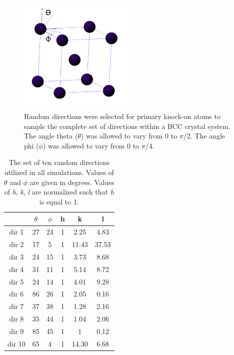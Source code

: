 \documentclass[review]{elsarticle}
\begin{document}
\begin{figure}[hp]
   \centering
   \includegraphics[width=0.5\textwidth]{figure1.png} %
   \caption{Random directions were selected for primary knock-on atoms to sample the complete set of directions within a BCC crystal system.  The angle theta ($\theta$) was allowed to vary from 0 to $\pi$/2.  The angle phi ($\phi$) was allowed to vary from 0 to $\pi$/4.}
   \label{fig:example}
\end{figure}

\begin{table}[htbp]
\caption[c]{The set of ten random directions utilized in all simulations.  Values of $\theta$ and $\phi$ are given in degrees.  Values of \textit{h}, \textit{k}, \textit{l} are normalized such that \textit{h} is equal to 1.}
\begin{center}
\begin{tabular}{|c|c|c|c|c|c|}
	\hline
	& $\theta$ & $\phi$ & h & k & l \\
	 \hline
	 dir 1 & 27 & 24 & 1 & 2.25 & 4.83 \\
	 dir 2 & 17 & 5 & 1 & 11.43 & 37.53 \\
	 dir 3 & 24 & 15 & 1 & 3.73 & 8.68 \\
	 dir 4 & 31 & 11 & 1 & 5.14 & 8.72 \\
	 dir 5 & 24 & 14 & 1 & 4.01 & 9.28 \\
	 dir 6 & 86 & 26 & 1 & 2.05 & 0.16 \\
	 dir 7 & 37 & 38 & 1 & 1.28 & 2.16 \\
	 dir 8 & 35 & 44 & 1 & 1.04 & 2.06 \\
	 dir 9 & 85 & 45 & 1 & 1 & 0.12 \\
	 dir 10 & 65 & 4 & 1 & 14.30 & 6.68 \\
	 \hline
\end{tabular}
\end{center}
\label{default}
\end{table}
 
\FloatBarrier


\end{document}
